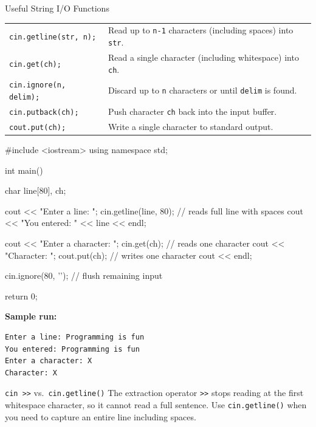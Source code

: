 \begin{infobox}{Useful String I/O Functions}
\begin{tabular}{@{}l l@{}}
\texttt{cin.getline(str, n);} & Read up to \texttt{n-1} characters
    (including spaces) into \texttt{str}. \\[4pt]
\texttt{cin.get(ch);}         & Read a single character (including
    whitespace) into \texttt{ch}. \\[4pt]
\texttt{cin.ignore(n, delim);} & Discard up to \texttt{n} characters
    or until \texttt{delim} is found. \\[4pt]
\texttt{cin.putback(ch);}     & Push character \texttt{ch} back into
    the input buffer. \\[4pt]
\texttt{cout.put(ch);}        & Write a single character to standard
    output. \\
\end{tabular}
\end{infobox}

\begin{cppcode}
#include <iostream>
using namespace std;

int main() {
    char line[80], ch;

    cout << "Enter a line: ";
    cin.getline(line, 80);       // reads full line with spaces
    cout << "You entered: " << line << endl;

    cout << "Enter a character: ";
    cin.get(ch);                 // reads one character
    cout << "Character: ";
    cout.put(ch);                // writes one character
    cout << endl;

    cin.ignore(80, '\n');        // flush remaining input

    return 0;
}
\end{cppcode}

\noindent
\textbf{Sample run:}
\begin{verbatim}
Enter a line: Programming is fun
You entered: Programming is fun
Enter a character: X
Character: X
\end{verbatim}

\begin{warningbox}{\texttt{cin >>} vs.\ \texttt{cin.getline()}}
The extraction operator \texttt{>>} stops reading at the first
whitespace character, so it cannot read a full sentence.  Use
\texttt{cin.getline()} when you need to capture an entire line
including spaces.
\end{warningbox}

